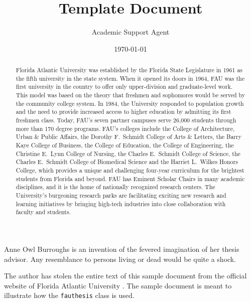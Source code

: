 \documentclass{article}
\title{Template Document}
\author{Academic Support Agent}
\date{\today}
\begin{document}
\maketitle

\maketitle
\makecopyright
\makesignature

\begin{vita}													%
Anne Owl Burroughs is an invention of the fevered imagination of her thesis advisor.  Any resemblance to persons living or dead would be quite a shock.
\end{vita}

\begin{acknowledgements}
The author has stolen the entire text of this sample document from the official website of Florida Atlantic University \cite{HFAU}.  The sample document is meant to illustrate how the \texttt{fauthesis} class is used.
\end{acknowledgements}

\begin{abstract}
Florida Atlantic University was established by the Florida State Legislature in 1961 as the fifth university in the state system.  When it opened its doors in 1964, FAU was the first university in the country to offer only upper-division and graduate-level work.  This model was based on the theory that freshmen and sophomores would be served by the community college system.  In 1984, the University responded to population growth and the need to provide increased access to higher education by admitting its first freshmen class.  Today, FAU's seven partner campuses serve 26,000 students through more than 170 degree programs.  FAU's colleges include the College of Architecture, Urban \& Public Affairs, the Dorothy F.~Schmidt College of Arts \& Letters, the Barry Kaye College of Business, the College of Education, the College of Engineering, the Christine E.~Lynn College of Nursing, the Charles E.~Schmidt College of Science, the Charles E.~Schmidt College of Biomedical Science and the Harriet L.~Wilkes Honors College, which provides a unique and challenging four-year curriculum for the brightest students from Florida and beyond.  FAU has Eminent Scholar Chairs in many academic disciplines, and it is the home of nationally recognized research centers.  The University's burgeoning research parks are facilitating exciting new research and learning initiatives by bringing high-tech industries into close collaboration with faculty and students.
\end{abstract}
\end{document}
